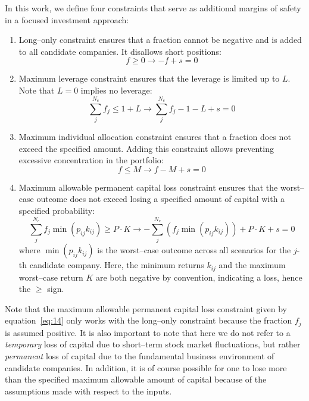 \documentclass{article}
\begin{document}
\indent In this work, we define four constraints that serve as additional
margins of safety in a focused investment approach:
\begin{enumerate}
    \item Long--only constraint ensures that a fraction cannot be negative and
    is added to all candidate companies. It disallows short positions:
    \begin{equation}
        \label{eq:11}
            f \ge 0 \rightarrow -f + s = 0
        \end{equation}

    \item Maximum leverage constraint ensures that the leverage is limited up to
    $L$. Note that $L = 0$ implies no leverage:
        \begin{equation}
        \label{eq:12}
            \sum_j^{N_c} f_j \le 1 + L \rightarrow \sum_j^{N_c} f_j - 1 - L + s = 0
        \end{equation}

    \item Maximum individual allocation constraint ensures that a fraction does
    not exceed the specified amount. Adding this constraint allows preventing
    excessive concentration in the portfolio:
        \begin{equation}
        \label{eq:13}
            f \le M \rightarrow f - M + s = 0
        \end{equation}

    \item Maximum allowable permanent capital loss constraint ensures that the
    worst--case outcome does not exceed losing a specified amount of capital
    with a specified probability:
        \begin{equation}
        \label{eq:14}
            \sum_j^{N_c} f_j \min(p_{ij} k_{ij}) \ge P \cdot K \rightarrow
            -\sum_j^{N_c} \left(f_j \min(p_{ij} k_{ij}) \right) + P \cdot K + s = 0
        \end{equation}
    \noindent where $\min(p_{ij} k_{ij})$ is the worst--case outcome across all
    scenarios for the $j$-th candidate company. Here, the minimum returns
    $k_{ij}$ and the maximum worst--case return $K$ are both negative by
    convention, indicating a loss, hence the $\ge$ sign.
\end{enumerate}

\indent Note that the maximum allowable permanent capital loss constraint
given by equation~\eqref{eq:14} only works with the long--only constraint
because the fraction $f_j$ is assumed positive. It is also important to note
that here we do not refer to a {\it temporary} loss of capital due to short--term
stock market fluctuations, but rather {\it permanent} loss of capital due to the
fundamental business environment of candidate companies. In addition, it is of
course possible for one to lose more than the specified maximum allowable amount
of capital because of the assumptions made with respect to the inputs.
\end{document}
